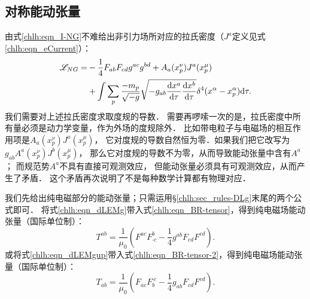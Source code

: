 \subsection{对称能动张量}
由式\eqref{chlh:eqn_I-NG}不难给出非引力场所对应的拉氏密度（$J^a$定义见式\eqref{chlh:eqn_eCurrent}）：
\begin{equation}\label{chlh:eqn_Lagrange-NG}
    \begin{aligned}
        \mathscr{L}_{NG} =& -\frac{1}{4} F_{ab} F_{cd} g^{ac}g^{bd} + A_{a}(x^\nu_p) J^a(x^\mu_p) \\
        &+  \int \sum_{p}\frac{- m_p }{\sqrt{-g}} \sqrt{-g_{ab} \frac{{\rm d} x^a}{{\rm d} \tau}
            \frac{{\rm d}x^b}{{\rm d} \tau} } \delta^4(x^\alpha-x^\alpha_p) {\rm d} \tau .
    \end{aligned}
\end{equation}
我们需要对上述拉氏密度求取度规的导数．
需要再啰嗦一次的是，拉氏密度中所有量必须是动力学变量，作为外场的度规除外．
比如带电粒子与电磁场的相互作用项是$A_{a}(x^\nu_p) J^a(x^\mu_p)$，
它对度规的导数自然恒为零．如果我们把它改写为$g_{ab}A^{a}(x^\nu_p) J^b(x^\mu_p)$，
那么它对度规的导数不为零，从而导致能动张量中含有$A^a$；
而规范势$A^a$不具有直接可观测效应，
但能动张量必须具有可观测效应，从而产生了矛盾．
这个矛盾再次说明了不是每种数学计算都有物理对应．




我们先给出纯电磁部分的能动张量；只需运用\S\ref{chlh:sec_rules-DLg}末尾的两个公式即可．
将式\eqref{chlh:eqn_dLEMg}带入式\eqref{chlh:eqn_BR-tensor}，得到纯电磁场能动张量（国际单位制）：
\begin{equation}\label{chlh:eqn_EM-tensor}
    T^{ab}=\frac{1}{\mu_0} \left( F^{ac} F^{b}_{\cdot c} - \frac{1}{4} g^{ab} F_{cd} F^{cd} \right) .
\end{equation}
或将式\eqref{chlh:eqn_dLEMgup}带入式\eqref{chlh:eqn_BR-tensor-2}，得到纯电磁场能动张量（国际单位制）：
\begin{equation}\label{chlh:eqn_EM-tensor-down}
    T_{ab}=\frac{1}{\mu_0} \left( F_{ac} F_{b}^{\cdot c} - \frac{1}{4} g_{ab} F_{cd} F^{cd} \right) .
\end{equation}


